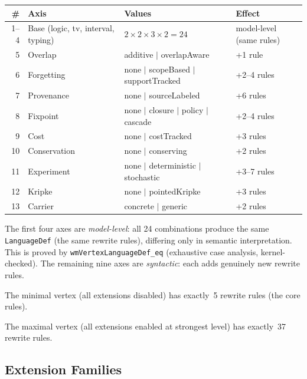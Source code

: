 \documentclass[11pt,openany]{report}
\begin{document}
\begin{center}
\begin{tabular}{rlll}
\toprule
\textbf{\#} & \textbf{Axis} & \textbf{Values} & \textbf{Effect} \\
\midrule
1--4 & Base (logic, tv, interval, typing)
     & $2 \times 2 \times 3 \times 2 = 24$
     & model-level (same rules) \\
5 & Overlap & additive $|$ overlapAware & +1 rule \\
6 & Forgetting & none $|$ scopeBased $|$ supportTracked & +2--4 rules \\
7 & Provenance & none $|$ sourceLabeled & +6 rules \\
8 & Fixpoint & none $|$ closure $|$ policy $|$ cascade & +2--4 rules \\
9 & Cost & none $|$ costTracked & +3 rules \\
10 & Conservation & none $|$ conserving & +2 rules \\
11 & Experiment & none $|$ deterministic $|$ stochastic & +3--7 rules \\
12 & Kripke & none $|$ pointedKripke & +3 rules \\
13 & Carrier & concrete $|$ generic & +2 rules \\
\bottomrule
\end{tabular}
\end{center}

The first four axes are \emph{model-level}: all 24 combinations produce the
same \texttt{LanguageDef} (the same rewrite rules), differing only in
semantic interpretation.  This is proved by \texttt{wmVertexLanguageDef\_eq}
(exhaustive case analysis, kernel-checked).  The remaining nine axes are
\emph{syntactic}: each adds genuinely new rewrite rules.

\begin{theorem}
The minimal vertex (all extensions disabled) has exactly~5 rewrite rules
(the core rules).
\end{theorem}

\begin{theorem}
The maximal vertex (all extensions enabled at strongest level) has exactly~37
rewrite rules.
\end{theorem}

\subsection{Extension Families}
\label{sec:wm-extensions}
\end{document}
